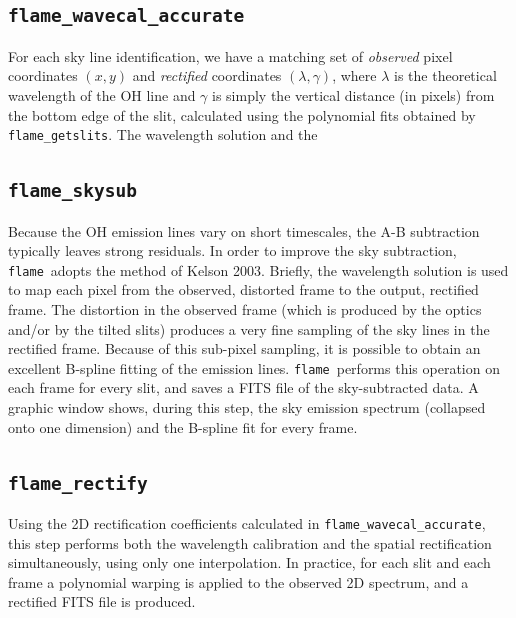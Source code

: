 \documentclass[a4paper, notitlepage]{article}
\newcommand{\flame}{\texttt{flame}}
\begin{document}
\subsection{\texttt{flame\_wavecal\_accurate}}

For each sky line identification, we have a matching set of \emph{observed} pixel coordinates $(x,y)$ and \emph{rectified} coordinates $(\lambda,\gamma)$, where $\lambda$ is the theoretical wavelength of the OH line and $\gamma$ is simply the vertical distance (in pixels) from the bottom edge of the slit, calculated using the polynomial fits obtained by \texttt{flame\_getslits}. The wavelength solution and the


\subsection{\texttt{flame\_skysub}}

Because the OH emission lines vary on short timescales, the A-B subtraction typically leaves strong residuals. In order to improve the sky subtraction, \flame\ adopts the method of Kelson 2003. Briefly, the wavelength solution is used to map each pixel from the observed, distorted frame to the output, rectified frame. The distortion in the observed frame (which is produced by the optics and/or by the tilted slits) produces a very fine sampling of the sky lines in the rectified frame. Because of this sub-pixel sampling, it is possible to obtain an excellent B-spline fitting of the emission lines. \flame\ performs this operation on each frame for every slit, and saves a FITS file of the sky-subtracted data. A graphic window shows, during this step, the sky emission spectrum (collapsed onto one dimension) and the B-spline fit for every frame.


\subsection{\texttt{flame\_rectify}}

Using the 2D rectification coefficients calculated in \texttt{flame\_wavecal\_accurate}, this step performs both the wavelength calibration and the spatial rectification simultaneously, using only one interpolation. In practice, for each slit and each frame a polynomial warping is applied to the observed 2D spectrum, and a rectified FITS file is produced.


\end{document}
